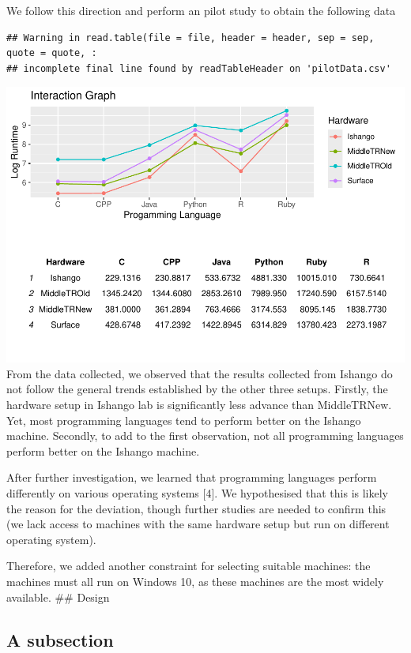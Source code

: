 \documentclass[12pt,halfline,a4paper,]{ouparticle}
\begin{document}
We follow this direction and perform an pilot study to obtain the
following data

\begin{verbatim}
## Warning in read.table(file = file, header = header, sep = sep, quote = quote, :
## incomplete final line found by readTableHeader on 'pilotData.csv'
\end{verbatim}

\includegraphics[width=1\linewidth]{skeleton_files/figure-latex/figPilot-1}
From the data collected, we observed that the results collected from
Ishango do not follow the general trends established by the other three
setups. Firstly, the hardware setup in Ishango lab is significantly less
advance than MiddleTRNew. Yet, most programming languages tend to
perform better on the Ishango machine. Secondly, to add to the first
observation, not all programming languages perform better on the Ishango
machine.

After further investigation, we learned that programming languages
perform differently on various operating systems {[}4{]}. We
hypothesised that this is likely the reason for the deviation, though
further studies are needed to confirm this (we lack access to machines
with the same hardware setup but run on different operating system).

Therefore, we added another constraint for selecting suitable machines:
the machines must all run on Windows 10, as these machines are the most
widely available. \#\# Design

\subsection{A subsection}\label{a-subsection}
\end{document}
